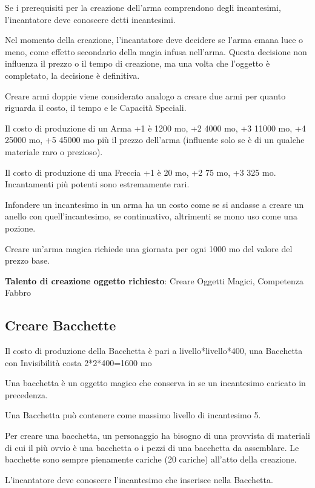 \begin{multicols}{2}
\medskip

Se i prerequisiti per la creazione dell'arma comprendono degli incantesimi, l'incantatore deve conoscere detti incantesimi.

Nel momento della creazione, l'incantatore deve decidere se l'arma emana luce o meno, come effetto secondario della magia infusa nell'arma. Questa decisione non influenza il prezzo o il tempo di creazione, ma una volta che l'oggetto è completato, la decisione è definitiva.

Creare armi doppie viene considerato analogo a creare due armi per quanto riguarda il costo, il tempo e le Capacità Speciali.

Il costo di produzione di un Arma +1 è 1200 mo, +2 4000 mo, +3 11000 mo, +4 25000 mo, +5 45000 mo più il prezzo dell'arma (influente solo se è di un qualche materiale raro o prezioso).

Il costo di produzione di una Freccia +1 è 20 mo, +2 75 mo, +3 325 mo. Incantamenti più potenti sono estremamente rari.

Infondere un incantesimo in un arma ha un costo come se si andasse a creare un anello con quell'incantesimo, se continuativo, altrimenti se mono uso come una pozione.

Creare un'arma magica richiede una giornata per ogni 1000 mo del valore del prezzo base.

\medskip

\textbf{Talento di creazione oggetto richiesto}: Creare Oggetti Magici, Competenza Fabbro

\subsection{Creare Bacchette}\label{crearebacchette}

Il costo di produzione della Bacchetta è pari a livello*livello*400, una Bacchetta con Invisibilità costa 2*2*400=1600 mo

Una bacchetta è un oggetto magico che conserva in se un incantesimo caricato in precedenza.

Una Bacchetta può contenere come massimo livello di incantesimo 5.

Per creare una bacchetta, un personaggio ha bisogno di una provvista di materiali di cui il più ovvio è una bacchetta o i pezzi di una bacchetta da assemblare. Le bacchette sono sempre pienamente cariche (20 cariche) all'atto della creazione.

L'incantatore deve conoscere l'incantesimo che inserisce nella Bacchetta.


\end{multicols}
